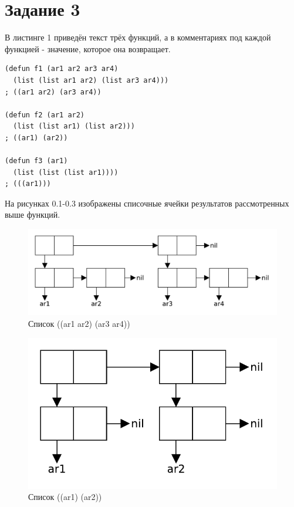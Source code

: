 \section{Задание 3}
В листинге 1 приведён текст трёх функций, а в комментариях под каждой функцией - значение, которое она возвращает.

\lstset{language=lisp}
\begin{lstlisting}[caption={Примеры функций, возвращающих списки}]
(defun f1 (ar1 ar2 ar3 ar4)
  (list (list ar1 ar2) (list ar3 ar4)))
; ((ar1 ar2) (ar3 ar4))

(defun f2 (ar1 ar2)
  (list (list ar1) (list ar2)))
; ((ar1) (ar2))

(defun f3 (ar1)
  (list (list (list ar1))))
; (((ar1)))
\end{lstlisting}

На рисунках 0.1-0.3 изображены списочные ячейки результатов рассмотренных выше функций.

\begin{figure}[H]
    \centering
    \includegraphics[scale=0.75]{data/pdf/02-01.pdf}
    \caption{Список ((ar1 ar2) (ar3 ar4))}
\end{figure}

\begin{figure}[H]
    \centering
    \includegraphics[scale=0.75]{data/pdf/02-02.pdf}
    \caption{Список ((ar1) (ar2))}
\end{figure}

